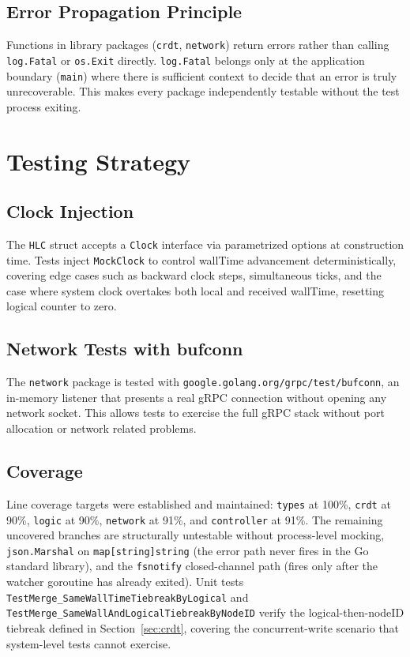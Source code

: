 \documentclass[conference]{IEEEtran}
\begin{document}
\subsection{Error Propagation Principle}

Functions in library packages (\texttt{crdt}, \texttt{network}) return
errors rather than calling \texttt{log.Fatal} or \texttt{os.Exit} directly.
\texttt{log.Fatal} belongs only at the application boundary (\texttt{main})
where there is sufficient context to decide that an error is truly
unrecoverable. This makes every package independently testable without the test process exiting.

\section{Testing Strategy}
\label{sec:testing}

\subsection{Clock Injection}

The \texttt{HLC} struct accepts a \texttt{Clock} interface via parametrized
options at construction time. Tests inject \texttt{MockClock} to control
wallTime advancement deterministically, covering edge cases such as
backward clock steps, simultaneous ticks, and the case where system clock
overtakes both local and received wallTime, resetting logical counter to zero.

\subsection{Network Tests with bufconn}

The \texttt{network} package is tested with \texttt{google.golang.org/grpc/test/bufconn},
an in-memory listener that presents a real gRPC connection without opening
any network socket. This allows tests to exercise the full gRPC stack without port
allocation or network related problems.

\subsection{Coverage}

Line coverage targets were established and maintained:
\texttt{types} at 100\%, \texttt{crdt} at 90\%, \texttt{logic}
at 90\%, \texttt{network} at 91\%, and
\texttt{controller} at 91\%. The remaining uncovered branches are structurally
untestable without process-level mocking, \texttt{json.Marshal} on \texttt{map[string]string} (the error path never
fires in the Go standard library), and the \texttt{fsnotify} closed-channel
path (fires only after the watcher goroutine has already exited).
Unit tests \texttt{TestMerge\_SameWallTimeTiebreakByLogical} and
\texttt{TestMerge\_SameWallAndLogicalTiebreakByNodeID} verify the
logical-then-nodeID tiebreak defined in Section~\ref{sec:crdt}, covering
the concurrent-write scenario that system-level tests cannot exercise.
\end{document}
